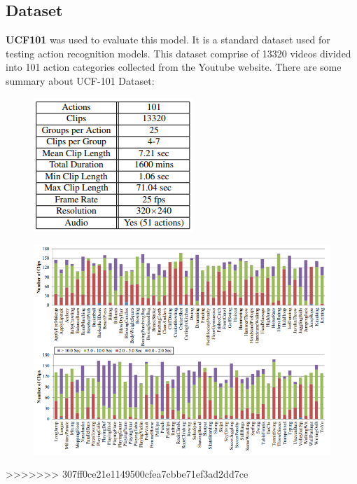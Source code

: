 \subsection{Dataset}
\textbf{UCF101}  was used to evaluate this model. It is a standard dataset used for testing action recognition models. This dataset comprise of 13320 videos divided into 101 action categories collected from the Youtube website.
There are some summary about UCF-101 Dataset:
\begin{center}
	\begin{figure}[H]
		\centering
		\includegraphics[width=0.4\columnwidth]{images/chap3/ucf-sum.png}
		\label{chap3:ucf-sum}
	\end{figure}
\end{center}
\begin{center}
	\begin{figure}[H]
		\centering
		\includegraphics[width=1\columnwidth]{images/chap3/ucf-sum-chart-2.png}
		\label{chap3:ucf-sum-chart-2}
	\end{figure}
\end{center}
>>>>>>> 307ff0ce21e1149500cfea7cbbe71ef3ad2dd7ce
